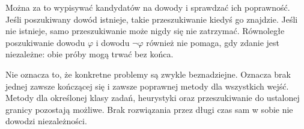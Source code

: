 Można za to wypisywać kandydatów na dowody i sprawdzać ich poprawność. Jeśli poszukiwany dowód istnieje, takie przeszukiwanie kiedyś go znajdzie. Jeśli nie istnieje, samo przeszukiwanie może nigdy się nie zatrzymać. Równoległe poszukiwanie dowodu $\varphi$ i dowodu $\neg\varphi$ również nie pomaga, gdy zdanie jest niezależne: obie próby mogą trwać bez końca.

Nie oznacza to, że konkretne problemy są zwykle beznadziejne. Oznacza brak jednej zawsze kończącej się i zawsze poprawnej metody dla wszystkich wejść. Metody dla określonej klasy zadań, heurystyki oraz przeszukiwanie do ustalonej granicy pozostają możliwe. Brak rozwiązania przez długi czas sam w sobie nie dowodzi niezależności.

